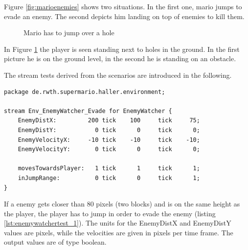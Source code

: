 Figure \ref{fig:marioenemies} shows two situations. In the first one, mario jumps to evade an enemy. The second depicts him landing on top of enemies to kill them.

\begin{figure} 
	\centering
	\caption{Mario has to jump over a hole} 
	\label{fig:mariohole}
\end{figure} 
In Figure \ref{fig:mariohole} the player is seen standing next to holes in the ground. In the first picture he is on the ground level, in the second he is standing on an obstacle.

The stream tests derived from the scenarios are introduced in the following.
\begin{lstlisting}[label=lst:enemywatchertest_1, caption=Enemy watcher stream test]
package de.rwth.supermario.haller.environment;

stream Env_EnemyWatcher_Evade for EnemyWatcher {
    EnemyDistX:         200 tick    100     tick     75;
    EnemyDistY:           0 tick      0     tick      0;
    EnemyVelocityX:     -10 tick    -10     tick    -10;
    EnemyVelocityY:       0 tick      0     tick      0;
            
    movesTowardsPlayer:   1 tick      1     tick      1;
    inJumpRange:          0 tick      0     tick      1;
}
\end{lstlisting}
If a enemy gets closer than 80 pixels (two blocks) and is on the same height as the player, the player has to jump in order to evade the enemy (listing \ref{lst:enemywatchertest_1}). The units for the EnemyDistX and EnemyDistY values are pixels, while the velocities are given in pixels per time frame.
The output values are of type boolean.

